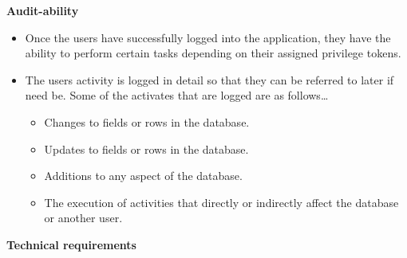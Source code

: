 \documentclass[10pt,a4paper]{article}
\begin{document}
\begin{center}\textbf{Audit-ability}\end{center}
                \begin{itemize}
                        \item  Once the users have successfully logged into the application, they have the ability to perform certain tasks depending on their assigned privilege tokens.
                        \end{itemize}
                \begin{itemize}
                        \item The users activity is logged in detail so that they can be referred to later if need be. Some of the activates that are logged are as follows…

                        \begin{itemize}
                                \item Changes to fields or rows in the database.
                        \end{itemize}
                        \begin{itemize}
                                \item Updates to fields or rows in the database.
                        \end{itemize}
                        \begin{itemize}
                                \item Additions to any aspect of the database.
                        \end{itemize}
                        \begin{itemize}
                                \item The execution of activities that directly or indirectly affect the database or another user.
                        \end{itemize}
                \end{itemize}						
                                                
\begin{center}\textbf{Technical requirements}\end{center}
\end{document}
